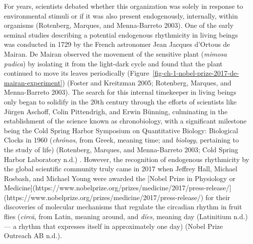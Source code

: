\documentclass[
  12pt,
  a4paper,
  oneside]{tesesusp}
\begin{document}
For years, scientists debated whether this organization was solely in
response to environmental stimuli or if it was also present
endogenously, internally, within organisms (Rotenberg, Marques, and
Menna-Barreto 2003). One of the early seminal studies describing a
potential endogenous rhythmicity in living beings was conducted in 1729
by the French astronomer Jean Jacques d'Ortous de Mairan. De Mairan
observed the movement of the sensitive plant (\emph{mimosa pudica}) by
isolating it from the light-dark cycle and found that the plant
continued to move its leaves periodically
(Figure~\ref{fig-ch-1-nobel-prize-2017-de-mairan-experiment}) (Foster
and Kreitzman 2005; Rotenberg, Marques, and Menna-Barreto 2003). The
search for this internal timekeeper in living beings only began to
solidify in the 20th century through the efforts of scientists like
Jürgen Aschoff, Colin Pittendrigh, and Erwin Bünning, culminating in the
establishment of the science known as chronobiology, with a significant
milestone being the Cold Spring Harbor Symposium on Quantitative
Biology: Biological Clocks in 1960 (\emph{chrónos}, from Greek, meaning
time; and \emph{biology}, pertaining to the study of life) (Rotenberg,
Marques, and Menna-Barreto 2003; Cold Spring Harbor Laboratory n.d.) .
However, the recognition of endogenous rhythmicity by the global
scientific community truly came in 2017 when Jeffrey Hall, Michael
Rosbash, and Michael Young were awarded the {[}Nobel Prize in Physiology
or
Medicine{]}(https://www.nobelprize.org/prizes/medicine/2017/press-release/{]}(https://www.nobelprize.org/prizes/medicine/2017/press-release/)
for their discoveries of molecular mechanisms that regulate the
circadian rhythm in fruit flies (\emph{circā}, from Latin, meaning
around, and \emph{dĭes}, meaning day (Latinitium n.d.) --- a rhythm that
expresses itself in approximately one day) (Nobel Prize Outreach AB
n.d.).
\end{document}
